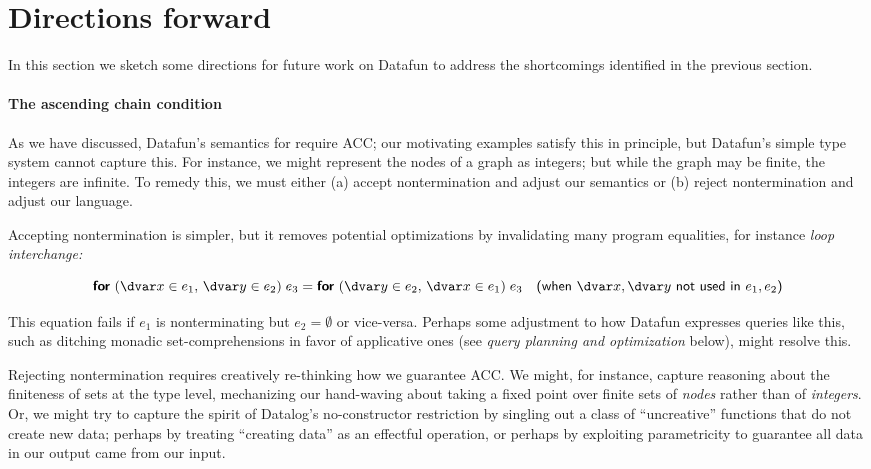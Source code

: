 
\section{Directions forward}

\label{section-extensions}

In this section we sketch some directions for future work on Datafun to address
the shortcomings identified in the previous section.

\paragraph{The ascending chain condition}

As we have discussed, Datafun's semantics for  require ACC; our motivating examples satisfy this in principle, but Datafun's simple type system cannot capture this. For instance, we might represent the nodes of a graph as integers; but while the graph may be finite, the integers are infinite. To remedy this, we must either (a) accept nontermination and adjust our semantics or (b) reject nontermination and adjust our language.

Accepting nontermination is simpler, but it removes potential optimizations by invalidating many program equalities, for instance \emph{loop interchange:}

\begin{equation*}
  \efor{\dvar x \in e_1,\, \dvar y \in e_2}{e_3}
  =
  \efor{\dvar y \in e_2,\, \dvar x \in e_1}{e_3}
  \quad\textsf{(when $\dvar x,\dvar y$ not used in $e_1,e_2$)}
\end{equation*}



\noindent
This equation fails if $e_1$ is nonterminating but $e_2 = \emptyset$ or
vice-versa. Perhaps some adjustment to how Datafun expresses queries like this, such as ditching monadic set-comprehensions in favor of applicative ones (see \emph{query planning and optimization} below), might resolve this.

Rejecting nontermination requires creatively re-thinking how we guarantee ACC.
We might, for instance, capture reasoning about the finiteness of sets at the
type level, mechanizing our hand-waving about taking a fixed point over finite
sets of \emph{nodes} rather than of \emph{integers}. Or, we might try to capture
the spirit of Datalog's no-constructor restriction by singling out a class of
``uncreative'' functions that do not create new data; perhaps by treating
``creating data'' as an effectful operation,\footnotemark{} or perhaps by exploiting parametricity to guarantee all data in our output came from our input.

